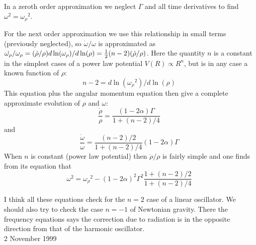    In a zeroth order approximation we neglect $\Gamma$ and all 
time derivatives to find $\omega^2 = {\omega_\rho}^2$.

   For the next order approximation we use this relationship in 
small terms (previously neglected), so $\dot{\omega} / \omega$ 
is approximated as 
$\dot{\omega_\rho} / \omega_\rho = (\dot{\rho}/\rho) 
d\ln(\omega_\rho) / d\ln(\rho) = \mbox{$\frac{1}{2}$} (n-2)(\dot{\rho}/\rho)$.  
Here the quantity $n$ is a constant in the simplest cases of a 
power law potential $V(R) \propto R^n$, but is in any case a 
known function of $\rho$:
$$
  n-2 = d\ln({\omega_\rho}^2)/d\ln(\rho) 
$$
This equation plus the angular momentum equation then give a 
complete approximate evolution of $\rho$ and $\omega$:
$$
  \frac{\dot{\rho}}{\rho} = \frac{(1-2\alpha)\Gamma}{1 + (n-2)/4}
$$
and 
$$
  \frac{\dot{\omega}}{\omega} = \frac{(n-2)/2}{1 + (n-2)/4} (1-2\alpha)\Gamma
$$
When $n$ is constant (power law potential) then
$\ddot{\rho}/\rho$ is fairly simple and one finds from its
equation that
$$
  \omega^2 = {\omega_\rho}^2 
             - (1-2\alpha)^2 \Gamma^2 \frac{1 + (n-2)/2}{1 + (n-2)/4}
$$

I think all these equations check for the $n=2$ case of a linear
oscillator.
We should also try to check the case $n= -1$ of Newtonian
gravity.
There the frequency equations says the correction due to
radiation is in the opposite direction from that of the harmonic
oscillator.\\[1ex]

\hfill 2 November 1999





